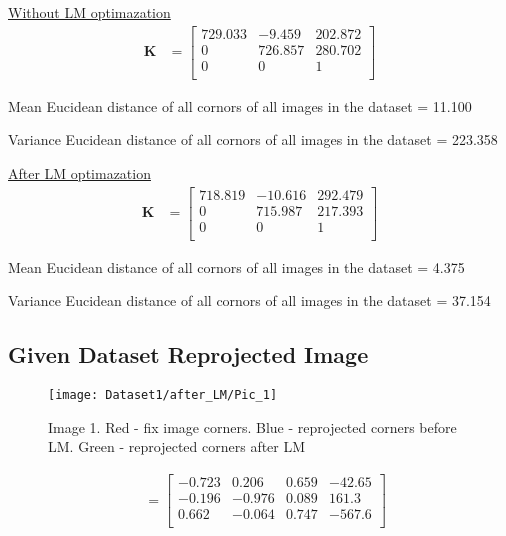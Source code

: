 \documentclass[11pt]{article}
\begin{document}
\underline{Without LM optimazation}
\begin{align*}
\mathbf{K} &= \begin{bmatrix} 
729.033 & -9.459 & 202.872 \\
0 & 726.857 & 280.702 \\
0 & 0 & 1 \\
\end{bmatrix}
\end{align*}

Mean Eucidean distance of all cornors of all images in the dataset = 11.100

Variance Eucidean distance of all cornors of all images in the dataset = 223.358

\vspace{1cm}
\underline{After LM optimazation}
\begin{align*}
\mathbf{K} &= \begin{bmatrix} 
718.819 & -10.616 & 292.479 \\
0 & 715.987 & 217.393 \\
0 & 0 & 1 \\
\end{bmatrix}
\end{align*}

Mean Eucidean distance of all cornors of all images in the dataset = 4.375

Variance Eucidean distance of all cornors of all images in the dataset = 37.154


\subsection*{Given Dataset Reprojected Image}

\begin{figure}[H]
\centering
\texttt{[image: Dataset1/after\_LM/Pic\_1]}
\caption{Image 1. Red - fix image corners. Blue - reprojected corners before LM. Green - reprojected corners after LM}
\label{}
\end{figure}

\begin{align*}
[\mathbf{R}|t] &= \begin{bmatrix} 
-0.723 & 0.206 & 0.659 & -42.65 \\
-0.196 & -0.976 & 0.089 & 161.3 \\
0.662 & -0.064 & 0.747 & -567.6\\
\end{bmatrix}
\end{align*}
\end{document}
